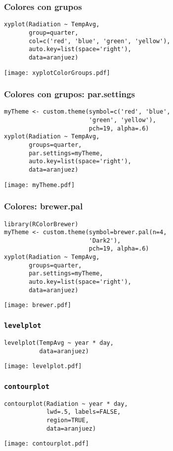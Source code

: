 \documentclass[xcolor={usenames,svgnames,dvipsnames}]{beamer}
\begin{document}
\begin{frame}[fragile]
\frametitle{Colores con grupos}
\label{sec-2-1-11}


\lstset{language=R}
\begin{lstlisting}
xyplot(Radiation ~ TempAvg,
       group=quarter,
       col=c('red', 'blue', 'green', 'yellow'),
       auto.key=list(space='right'),
       data=aranjuez)
\end{lstlisting}

\texttt{[image: xyplotColorGroups.pdf]}
\end{frame}
\begin{frame}[fragile]
\frametitle{Colores con grupos: par.settings}
\label{sec-2-1-12}


\lstset{language=R}
\begin{lstlisting}
myTheme <- custom.theme(symbol=c('red', 'blue',
                        'green', 'yellow'),
                        pch=19, alpha=.6)
xyplot(Radiation ~ TempAvg,
       groups=quarter,
       par.settings=myTheme,
       auto.key=list(space='right'),
       data=aranjuez)
\end{lstlisting}

\texttt{[image: myTheme.pdf]}
\end{frame}
\begin{frame}[fragile]
\frametitle{Colores: brewer.pal}
\label{sec-2-1-13}


\lstset{language=R}
\begin{lstlisting}
library(RColorBrewer)
myTheme <- custom.theme(symbol=brewer.pal(n=4,
                        'Dark2'),
                        pch=19, alpha=.6)
xyplot(Radiation ~ TempAvg,
       groups=quarter,
       par.settings=myTheme,
       auto.key=list(space='right'),
       data=aranjuez)
\end{lstlisting}

\texttt{[image: brewer.pdf]}
\end{frame}
\begin{frame}[fragile]
\frametitle{\texttt{levelplot}}
\label{sec-2-1-14}


\lstset{language=R}
\begin{lstlisting}
levelplot(TempAvg ~ year * day,
          data=aranjuez)
\end{lstlisting}

\texttt{[image: levelplot.pdf]}
\end{frame}
\begin{frame}[fragile]
\frametitle{\texttt{contourplot}}
\label{sec-2-1-15}


\lstset{language=R}
\begin{lstlisting}
contourplot(Radiation ~ year * day,
            lwd=.5, labels=FALSE,
            region=TRUE, 
            data=aranjuez)
\end{lstlisting}

\texttt{[image: contourplot.pdf]}
\end{frame}
\end{document}
